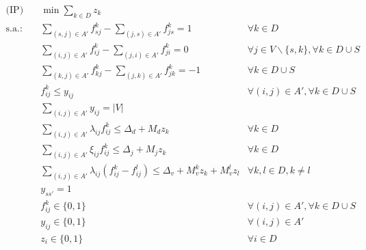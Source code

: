 \allowdisplaybreaks
\begin{align}
\text{(IP)} \quad 
    & \displaystyle \min \sum_{k \in D}z_k & \label{eq:mod-fo} \\
\text{s.a.:} \quad
    & \displaystyle \sum_{(s, j) \in A'} f_{sj}^{k} - \sum_{(j, s) \in A'} f_{js}^{k} = 1 & \forall k \in D \label{eq:fluxo-raiz} \\
    & \displaystyle \sum_{(i, j) \in A'} f_{ij}^{k} - \sum_{(j, i) \in A'} f_{ji}^{k} = 0 & \forall j \in V \backslash \{s, k\}, \forall k \in D \cup S \label{eq:fluxo-qualquer} \\
    & \displaystyle \sum_{(k, j) \in A'} f_{kj}^{k} - \sum_{(j, k) \in A'} f_{jk}^{k} = -1 & \forall k \in D \cup S \label{eq:fluxo-terminal} \\
    & f_{ij}^{k} \leq  y_{ij} & \forall (i, j) \in A', \forall k \in D \cup S \label{eq:rel-f-y-term} \\
    & \displaystyle \sum_{(i, j) \in A'} y_{ij} = |V| & \label{eq:num-arestas-arvore} \\
    & \displaystyle \sum_{(i, j) \in A'} \lambda_{ij}f_{ij}^{k} \leq  \Delta_{d} + M_dz_k
     & \forall k \in D \label{eq:mod-lim-delay} \\
    & \displaystyle \sum_{(i, j) \in A'} \xi_{ij}f_{ij}^{k} \leq  \Delta_{j} + M_jz_k
     & \forall k \in D \label{eq:mod-lim-jitter} \\
    & \displaystyle \sum_{(i, j) \in A'} \lambda_{ij}(f_{ij}^{k} - f_{ij}^{l}) \leq \Delta_{v} 
       + M_v^kz_k + M_v^lz_l 
    & \forall k, l \in D, k \neq l \label{eq:mod-var-delay} \\
    & y_{ss'} = 1 & \label{eq:force-dummy-node} \\
    & f_{ij}^{k} \in \{0, 1\} & \forall (i, j) \in A', \forall k \in D \cup S \label{eq:dom-f} \\
    &  y_{ij} \in \{0, 1\} &  \forall (i, j) \in A' \label{eq:dom-y} \\
    &  z_{i} \in \{0, 1\} &  \forall i \in D \label{eq:dom-z} 
\end{align}

